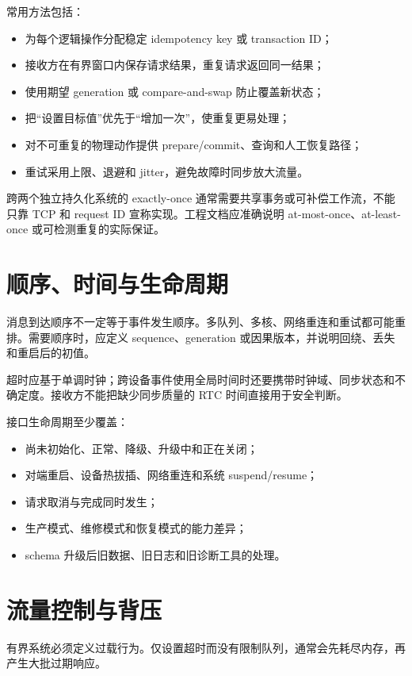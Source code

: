 常用方法包括：

\begin{itemize}
  \item 为每个逻辑操作分配稳定 idempotency key 或 transaction ID；
  \item 接收方在有界窗口内保存请求结果，重复请求返回同一结果；
  \item 使用期望 generation 或 compare-and-swap 防止覆盖新状态；
  \item 把“设置目标值”优先于“增加一次”，使重复更易处理；
  \item 对不可重复的物理动作提供 prepare/commit、查询和人工恢复路径；
  \item 重试采用上限、退避和 jitter，避免故障时同步放大流量。
\end{itemize}

跨两个独立持久化系统的 exactly-once 通常需要共享事务或可补偿工作流，不能只靠 TCP 和 request ID 宣称实现。工程文档应准确说明 at-most-once、at-least-once 或可检测重复的实际保证。

\section{顺序、时间与生命周期}

消息到达顺序不一定等于事件发生顺序。多队列、多核、网络重连和重试都可能重排。需要顺序时，应定义 sequence、generation 或因果版本，并说明回绕、丢失和重启后的初值。

超时应基于单调时钟；跨设备事件使用全局时间时还要携带时钟域、同步状态和不确定度。接收方不能把缺少同步质量的 RTC 时间直接用于安全判断。

接口生命周期至少覆盖：

\begin{itemize}
  \item 尚未初始化、正常、降级、升级中和正在关闭；
  \item 对端重启、设备热拔插、网络重连和系统 suspend/resume；
  \item 请求取消与完成同时发生；
  \item 生产模式、维修模式和恢复模式的能力差异；
  \item schema 升级后旧数据、旧日志和旧诊断工具的处理。
\end{itemize}

\section{流量控制与背压}

有界系统必须定义过载行为。仅设置超时而没有限制队列，通常会先耗尽内存，再产生大批过期响应。

